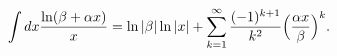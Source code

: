 \begin{equation}
\int dx \frac{\ln (\beta + \alpha x)}{x} = \ln \vert \beta \vert
\ln \vert x \vert + \sum_{k = 1}^{\infty}
\frac{(-1)^{k+1}}{k^2} \Bigl(\frac{\alpha x}{\beta} \Bigr)^k. \label{int}
\end{equation}

